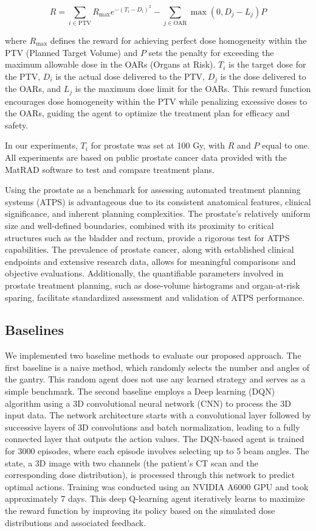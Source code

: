 \documentclass[runningheads]{llncs}
\begin{document}
\[ R = \sum_{i \in \text{PTV}} R_{\text{max}} e^{-(T_i - D_i)^2} - \sum_{j \in \text{OAR}} \max(0, D_j - L_j) P \]

where \(R_{\text{max}}\) defines the reward for achieving perfect dose homogeneity within the PTV (Planned Target Volume) and \(P\) sets the penalty for exceeding the maximum allowable dose in the OARs (Organs at Risk). \(T_i\) is the target dose for the PTV, \(D_i\) is the actual dose delivered to the PTV, \(D_j\) is the dose delivered to the OARs, and \(L_j\) is the maximum dose limit for the OARs. This reward function encourages dose homogeneity within the PTV while penalizing excessive doses to the OARs, guiding the agent to optimize the treatment plan for efficacy and safety.

In our experiments, \(T_i\) for prostate was set at 100 Gy, with \(R\) and \(P\) equal to one. All experiments are based on public prostate cancer data provided with the MatRAD software to test and compare treatment plans.

Using the prostate as a benchmark for assessing automated treatment planning systems (ATPS) is advantageous due to its consistent anatomical features, clinical significance, and inherent planning complexities. The prostate’s relatively uniform size and well-defined boundaries, combined with its proximity to critical structures such as the bladder and rectum, provide a rigorous test for ATPS capabilities. The prevalence of prostate cancer, along with established clinical endpoints and extensive research data, allows for meaningful comparisons and objective evaluations. Additionally, the quantifiable parameters involved in prostate treatment planning, such as dose-volume histograms and organ-at-risk sparing, facilitate standardized assessment and validation of ATPS performance.



\subsection{Baselines}

We implemented two baseline methods to evaluate our proposed approach. The first baseline is a naive method, which randomly selects the number and angles of the gantry. This random agent does not use any learned strategy and serves as a simple benchmark. The second baseline employs a Deep learning (DQN) algorithm using a 3D convolutional neural network (CNN) to process the 3D input data. The network architecture starts with a convolutional layer followed by successive layers of 3D convolutions and batch normalization, leading to a fully connected layer that outputs the action values. The DQN-based agent is trained for 3000 episodes, where each episode involves selecting up to 5 beam angles. The state, a 3D image with two channels (the patient's CT scan and the corresponding dose distribution), is processed through this network to predict optimal actions. Training was conducted using an NVIDIA A6000 GPU and took approximately 7 days. This deep Q-learning agent iteratively learns to maximize the reward function by improving its policy based on the simulated dose distributions and associated feedback.
\end{document}
